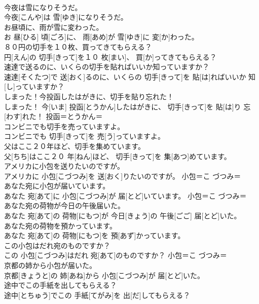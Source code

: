 \documentclass[8pt]{extreport}
\begin{document}
\begin{CJK}{UTF8}{min}
\\	今夜は雪になりそうだ。	
\\	今夜[こんや]は 雪[ゆき]になりそうだ。	
\\	お昼頃に、雨が雪に変わった。	
\\	お 昼[ひる] 頃[ごろ]に、 雨[あめ]が 雪[ゆき]に 変[か]わった。	
\\	８０円の切手を１０枚、買ってきてもらえる？	
\\	円[えん]の 切手[きって]を１０ 枚[まい]、 買[か]ってきてもらえる？	
\\	速達で送るのに、いくらの切手を貼ればいいか知っていますか？	
\\	速達[そくたつ]で 送[おく]るのに、いくらの 切手[きって]を 貼[は]ればいいか 知[し]っていますか？	
\\	しまった！今投函したはがきに、切手を貼り忘れた！	
\\	しまった！ 今[いま] 投函[とうかん]したはがきに、 切手[きって]を 貼[は]り 忘[わす]れた！	投函＝とうかん＝ 
\\	コンビニでも切手を売っていますよ。	
\\	コンビニでも 切手[きって]を 売[う]っていますよ。	
\\	父はここ２０年ほど、切手を集めています。	
\\	父[ちち]はここ２０ 年[ねん]ほど、 切手[きって]を 集[あつ]めています。	
\\	アメリカに小包を送りたいのですが。	
\\	アメリカに 小包[こづつみ]を 送[おく]りたいのですが。	小包＝こ づつみ＝ 
\\	あなた宛に小包が届いています。	
\\	あなた 宛[あて]に 小包[こづつみ]が 届[とど]いています。	小包＝こ づつみ＝ 
\\	あなた宛の荷物が今日の午後届いた。	
\\	あなた 宛[あて]の 荷物[にもつ]が 今日[きょう]の 午後[ごご] 届[とど]いた。	
\\	あなた宛の荷物を預かっています。	
\\	あなた 宛[あて]の 荷物[にもつ]を 預[あず]かっています。	
\\	この小包はだれ宛のものですか？	
\\	この 小包[こづつみ]はだれ 宛[あて]のものですか？	小包＝こ づつみ＝ 
\\	京都の姉から小包が届いた。	
\\	京都[きょうと]の 姉[あね]から 小包[こづつみ]が 届[とど]いた。	
\\	途中でこの手紙を出してもらえる？	
\\	途中[とちゅう]でこの 手紙[てがみ]を 出[だ]してもらえる？	

\end{CJK}
\end{document}
